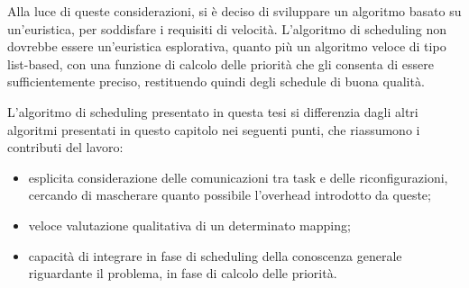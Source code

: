 Alla luce di queste considerazioni, si è deciso di sviluppare un algoritmo basato su
un'euristica, per soddisfare i requisiti di velocità. L'algoritmo di scheduling non
dovrebbe essere un'euristica esplorativa, quanto più un algoritmo veloce di tipo list-based,
con una funzione di calcolo delle priorità che gli consenta di essere sufficientemente preciso,
restituendo quindi degli schedule di buona qualità.

L'algoritmo di scheduling presentato in questa tesi si differenzia dagli
altri algoritmi presentati in questo capitolo nei seguenti punti, che riassumono i contributi del lavoro:
\begin{itemize}
  \item esplicita considerazione delle comunicazioni tra task e delle riconfigurazioni,
    cercando di mascherare quanto possibile l'overhead introdotto da queste;
  \item veloce valutazione qualitativa di un determinato mapping;
  \item capacit\`a di integrare in fase di scheduling della conoscenza generale riguardante
    il problema, in fase di calcolo delle priorit\`a.
\end{itemize}
